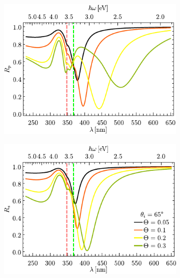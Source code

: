 \begin{figure}[h!]
	\hspace*{-1.5em}
	\begin{subfigure}{.01\linewidth}\caption{}\label{sfig:Ag-cutp}\vspace{4.5cm}\end{subfigure}
	\begin{subfigure}{.45\linewidth}\hspace*{-1.5em}
	\includegraphics[scale=1]{2-Resultados/figs/7-AgThetaVar/cut_angle_65_p.pdf}\end{subfigure}
	\begin{subfigure}{.01\linewidth}\caption{}\label{sfig:Ag-cuts}\vspace{4.5cm}\end{subfigure}\hspace*{-1.em}
	\begin{subfigure}{.45\linewidth}\centering
	\includegraphics[scale=1 ]{2-Resultados/figs/7-AgThetaVar/cut_angle_65_s.pdf}\end{subfigure}\vspace*{-.5em}

\end{figure}
